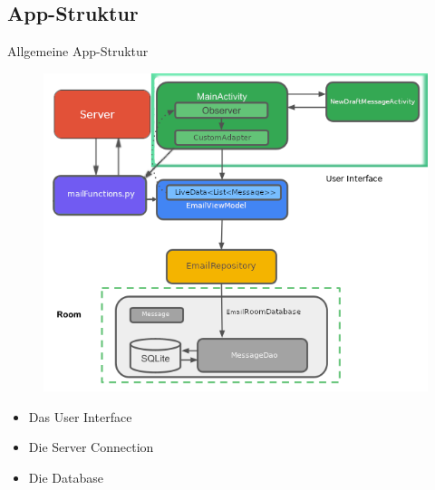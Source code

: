 \documentclass[aspectratio=169]{beamer}
\begin{document}
\subsection{App-Struktur}
\begin{frame}[plain]{Allgemeine App-Struktur}
\begin{varwidth}{.3\textwidth}
    \pause
        \begin{figure}
            \centering
            \includegraphics[height=.7\textheight]{../maturText/media/AppStructureFull.png}
        \end{figure}
    \end{varwidth}
    \hfill
    \begin{varwidth}{.5\textwidth}
        \begin{itemize}\pause
            \item Das User Interface \pause
            \item Die Server Connection \pause
            \item Die Database \pause
        \end{itemize}
    \end{varwidth} 
\end{frame}
\end{document}
